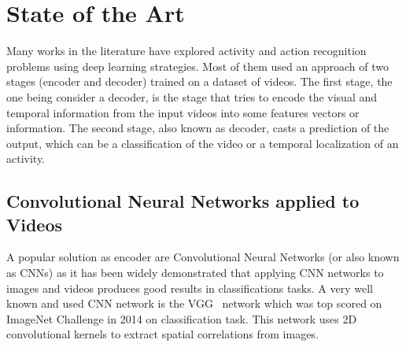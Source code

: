 \chapter{State of the Art}




Many works in the literature have explored activity and action recognition problems using deep learning strategies. Most of them used an approach of two stages (encoder and decoder) trained on a dataset of videos. The first stage, the one being consider a decoder, is the stage that tries to encode the visual and temporal information from the input videos into some features vectors or information. The second stage, also known as decoder, casts a prediction of the output, which can be a classification of the video or a temporal localization of an activity.

\section{Convolutional Neural Networks applied to Videos}

A popular solution as encoder are Convolutional Neural Networks (or also known as CNNs) as it has been widely demonstrated that applying CNN networks to images and videos produces good results in classifications tasks. A very well known and used CNN network is the VGG~\cite{Simonyan14c} network which was top scored on ImageNet Challenge in 2014 on classification task. This network uses 2D convolutional kernels to extract spatial correlations from images.

